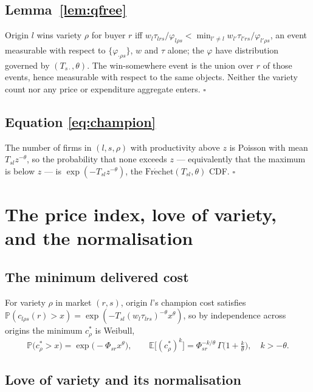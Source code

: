 \documentclass[11pt]{article}
\newcommand{\E}{\mathbb{E}}
\newcommand{\Prob}{\mathbb{P}}
\newcommand{\Frechet}{\mathrm{Fr\acute{e}chet}}
\begin{document}
\subsection*{Lemma~\ref{lem:qfree}}

Origin $l$ wins variety $\rho$ for buyer $r$ iff
$w_{l}\tau_{lrs}/\varphi_{l\rho s}<\min_{l'\neq l}w_{l'}\tau_{l'rs}/\varphi_{l'\rho s}$, an event
measurable with respect to $\{\varphi_{\cdot\rho s}\}$, $w$ and $\tau$ alone; the $\varphi$ have
distribution governed by $(T_{s\cdot},\theta)$. The win-somewhere event is the union over $r$ of
those events, hence measurable with respect to the same objects. Neither the variety count nor any
price or expenditure aggregate enters. \hfill$\square$

\subsection*{Equation \eqref{eq:champion}}

The number of firms in $(l,s,\rho)$ with productivity above $z$ is Poisson with mean
$T_{sl}z^{-\theta}$, so the probability that none exceeds $z$ --- equivalently that the maximum is
below $z$ --- is $\exp(-T_{sl}z^{-\theta})$, the $\Frechet(T_{sl},\theta)$ CDF. \hfill$\square$

\section{The price index, love of variety, and the normalisation}
\label{app:price}

\subsection*{The minimum delivered cost}

For variety $\rho$ in market $(r,s)$, origin $l$'s champion cost satisfies
$\Prob(c_{l\rho s}(r)>x)=\exp(-T_{sl}(w_{l}\tau_{lrs})^{-\theta}x^{\theta})$, so by independence
across origins the minimum $c^{*}_{\rho}$ is Weibull,
\begin{equation}
\Prob\big(c^{*}_{\rho}>x\big)=\exp\!\big(-\Phi_{sr}x^{\theta}\big),
\qquad
\E\big[(c^{*}_{\rho})^{k}\big]=\Phi_{sr}^{-k/\theta}\,\Gamma\!\Big(1+\tfrac{k}{\theta}\Big),
\quad k>-\theta .
\label{eq:app-weibull}
\end{equation}

\subsection*{Love of variety and its normalisation}
\end{document}
